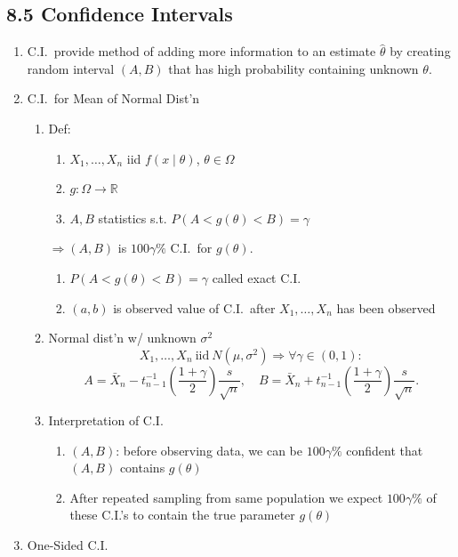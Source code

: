 \documentclass[11pt]{article}
\begin{document}
\subsection*{8.5 Confidence Intervals}
\begin{enumerate}[label=\Roman*.]
  \item C.I.\ provide method of adding more information to an estimate $\hat\theta$ by creating random interval $(A,B)$ that has high probability containing unknown $\theta$.
  \item C.I.\ for Mean of Normal Dist'n
  \begin{enumerate}[label=\Alph*.]
    \item Def:
    \begin{enumerate}[label=\arabic*.]
      \item $X_{1},\dots,X_{n}$ iid $f(x\mid\theta)$, $\theta\in\Omega$
      \item $g:\Omega\to\mathbb{R}$
      \item $A,B$ statistics s.t. $P(A<g(\theta)<B)=\gamma$
    \end{enumerate}
    $\Rightarrow (A,B)$ is $100\gamma\%$ C.I.\ for $g(\theta)$.
    \begin{enumerate}[label=\arabic*.,start=4]
      \item $P(A<g(\theta)<B)=\gamma$ called exact C.I.
      \item $(a,b)$ is observed value of C.I.\ after $X_{1},\dots,X_{n}$ has been observed
    \end{enumerate}
    \item Normal dist'n w/ unknown $\sigma^{2}$
    \[
      X_{1},\dots,X_{n}\ \text{iid}\ N(\mu,\sigma^{2})\Rightarrow \forall\gamma\in(0,1):
    \]
    \[
      A=\bar X_{n}-t^{-1}_{n-1}\!\left(\frac{1+\gamma}{2}\right)\frac{s}{\sqrt{n}},\quad
      B=\bar X_{n}+t^{-1}_{n-1}\!\left(\frac{1+\gamma}{2}\right)\frac{s}{\sqrt{n}}.
    \]
    \item Interpretation of C.I.
    \begin{enumerate}[label=\arabic*.]
      \item $(A,B)$: before observing data, we can be $100\gamma\%$ confident that $(A,B)$ contains $g(\theta)$
      \item After repeated sampling from same population we expect $100\gamma\%$ of these C.I.'s to contain the true parameter $g(\theta)$
    \end{enumerate}
  \end{enumerate}
  \item One-Sided C.I.

\end{enumerate}
\end{document}
